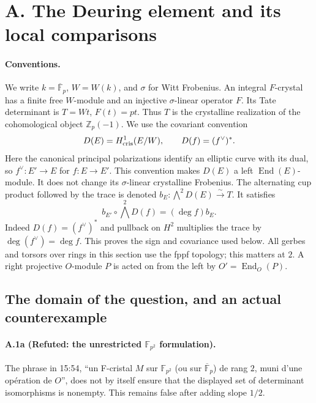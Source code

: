 \section{A. The Deuring element and its local comparisons}
\label{sec:deuring}

\paragraph{Conventions.}
We write $k=\overline{\mathbb F}_p$, $W=W(k)$, and $\sigma$ for Witt
Frobenius. An integral $F$-crystal has a finite free $W$-module and an
injective $\sigma$-linear operator $F$. Its Tate determinant is
$T=W t$, $F(t)=pt$. Thus $T$ is the crystalline realization of the
cohomological object $\mathbb Z_p(-1)$. We use the covariant convention
\[
 D(E)=H^1_{\rm cris}(E/W),\qquad D(f)=(f^\vee)^*.
\]
Here the canonical principal polarizations identify an elliptic curve
with its dual, so $f^\vee:E'\to E$ for $f:E\to E'$. This convention makes
$D(E)$ a left $\operatorname{End}(E)$-module. It does not change its
$\sigma$-linear crystalline Frobenius. The alternating cup product followed
by the trace is denoted $b_E:\bigwedge^2D(E)\xrightarrow{\sim}T$.
It satisfies
\begin{equation}\label{eq:A-degree}
 b_{E'}\circ\bigwedge^2D(f)=(\deg f)b_E.
\end{equation}
Indeed $D(f)=(f^\vee)^*$ and pullback on $H^2$ multiplies the trace by
$\deg(f^\vee)=\deg f$. This proves the sign and covariance used below.
All gerbes and torsors over rings in this section use the fppf topology;
this matters at $2$. A right projective $O$-module $P$ is acted on from the
left by $O'=\operatorname{End}_O(P)$.

\subsection{The domain of the question, and an actual counterexample}

\paragraph{A.1a (Refuted: the unrestricted $\mathbb F_{p^2}$ formulation).}
The phrase in 15:54, ``un F-cristal $M$ sur $\mathbb F_{p^2}$ (ou sur
$\overline{\mathbb F}_p$) de rang $2$, muni d'une opération de $O$'',
does not by itself ensure that the displayed set of determinant
isomorphisms is nonempty. This remains false after adding slope $1/2$.

